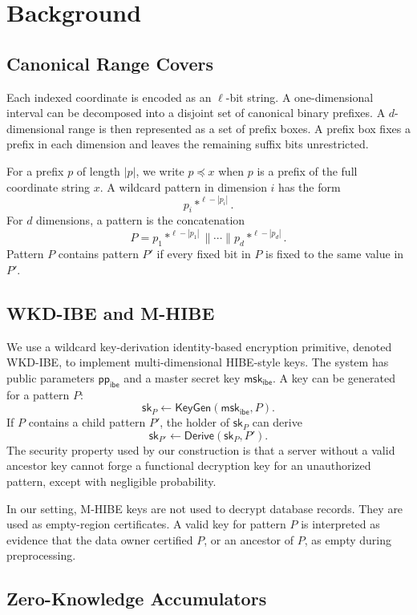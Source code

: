 \documentclass[11pt]{article}
\newcommand{\KeyGen}{\mathsf{KeyGen}}
\newcommand{\Derive}{\mathsf{Derive}}
\newcommand{\pp}{\mathsf{pp}}
\newcommand{\msk}{\mathsf{msk}}
\newcommand{\sk}{\mathsf{sk}}
\begin{document}
\section{Background}

\subsection{Canonical Range Covers}

Each indexed coordinate is encoded as an $\ell$-bit string. A one-dimensional interval can be decomposed into a disjoint set of canonical binary prefixes. A $d$-dimensional range is then represented as a set of prefix boxes. A prefix box fixes a prefix in each dimension and leaves the remaining suffix bits unrestricted.

For a prefix $p$ of length $|p|$, we write $p \preceq x$ when $p$ is a prefix of the full coordinate string $x$. A wildcard pattern in dimension $i$ has the form
\[
  p_i *^{\ell-|p_i|}.
\]
For $d$ dimensions, a pattern is the concatenation
\[
  P =
  p_1 *^{\ell-|p_1|}
  \parallel \cdots \parallel
  p_d *^{\ell-|p_d|}.
\]
Pattern $P$ contains pattern $P'$ if every fixed bit in $P$ is fixed to the same value in $P'$.

\subsection{WKD-IBE and M-HIBE}

We use a wildcard key-derivation identity-based encryption primitive, denoted WKD-IBE, to implement multi-dimensional HIBE-style keys. The system has public parameters $\pp_{\mathsf{ibe}}$ and a master secret key $\msk_{\mathsf{ibe}}$. A key can be generated for a pattern $P$:
\[
  \sk_P \leftarrow \KeyGen(\msk_{\mathsf{ibe}},P).
\]
If $P$ contains a child pattern $P'$, the holder of $\sk_P$ can derive
\[
  \sk_{P'} \leftarrow \Derive(\sk_P,P').
\]
The security property used by our construction is that a server without a valid ancestor key cannot forge a functional decryption key for an unauthorized pattern, except with negligible probability.

In our setting, M-HIBE keys are not used to decrypt database records. They are used as empty-region certificates. A valid key for pattern $P$ is interpreted as evidence that the data owner certified $P$, or an ancestor of $P$, as empty during preprocessing.

\subsection{Zero-Knowledge Accumulators}
\end{document}
